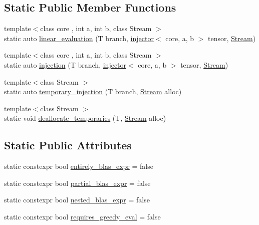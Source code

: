 \subsection*{Static Public Member Functions}
\begin{DoxyCompactItemize}
\item 
{\footnotesize template$<$class core , int a, int b, class Stream $>$ }\\static auto \hyperlink{structBC_1_1tensors_1_1exprs_1_1optimizer__default_a50a018966e5b9b24460c2683899c2817}{linear\+\_\+evaluation} (T branch, \hyperlink{structBC_1_1tensors_1_1exprs_1_1injector}{injector}$<$ core, a, b $>$ tensor, \hyperlink{namespaceBC_abc64a63cd29a22d102a68f478dfd588d}{Stream})
\item 
{\footnotesize template$<$class core , int a, int b, class Stream $>$ }\\static auto \hyperlink{structBC_1_1tensors_1_1exprs_1_1optimizer__default_a9a0b7a6f6b42ad40fce8f5cdd18be415}{injection} (T branch, \hyperlink{structBC_1_1tensors_1_1exprs_1_1injector}{injector}$<$ core, a, b $>$ tensor, \hyperlink{namespaceBC_abc64a63cd29a22d102a68f478dfd588d}{Stream})
\item 
{\footnotesize template$<$class Stream $>$ }\\static auto \hyperlink{structBC_1_1tensors_1_1exprs_1_1optimizer__default_aa1bfdb0af48bc8eb682f42e93cfb3a64}{temporary\+\_\+injection} (T branch, \hyperlink{namespaceBC_abc64a63cd29a22d102a68f478dfd588d}{Stream} alloc)
\item 
{\footnotesize template$<$class Stream $>$ }\\static void \hyperlink{structBC_1_1tensors_1_1exprs_1_1optimizer__default_a6fa58f9f733ea6eb8d35cffc871e57bd}{deallocate\+\_\+temporaries} (T, \hyperlink{namespaceBC_abc64a63cd29a22d102a68f478dfd588d}{Stream} alloc)
\end{DoxyCompactItemize}
\subsection*{Static Public Attributes}
\begin{DoxyCompactItemize}
\item 
static constexpr bool \hyperlink{structBC_1_1tensors_1_1exprs_1_1optimizer__default_affc16fc7c278511306ea504e5e73163f}{entirely\+\_\+blas\+\_\+expr} = false
\item 
static constexpr bool \hyperlink{structBC_1_1tensors_1_1exprs_1_1optimizer__default_a31f56cf6b64b5a00392d18ebb17d8bf9}{partial\+\_\+blas\+\_\+expr} = false
\item 
static constexpr bool \hyperlink{structBC_1_1tensors_1_1exprs_1_1optimizer__default_ae092b40b3bc16f0b846ba3228c5336fc}{nested\+\_\+blas\+\_\+expr} = false
\item 
static constexpr bool \hyperlink{structBC_1_1tensors_1_1exprs_1_1optimizer__default_a5c8310dce5595c496a7e396501ee7949}{requires\+\_\+greedy\+\_\+eval} = false
\end{DoxyCompactItemize}


